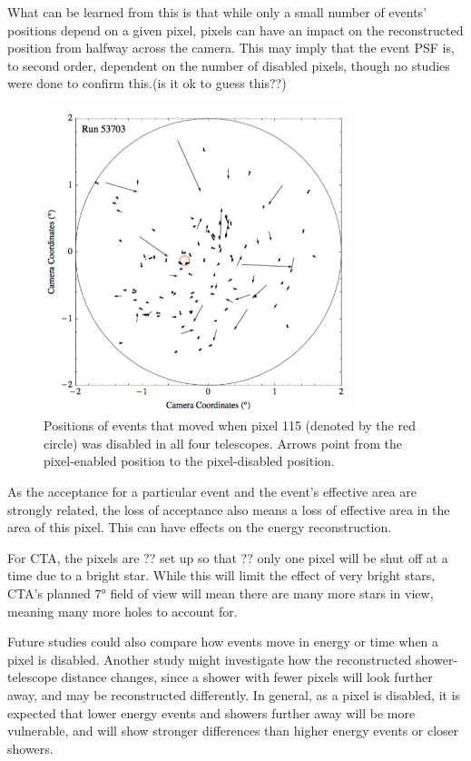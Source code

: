     What can be learned from this is that while only a small number of events' positions depend on a given pixel, pixels can have an impact on the reconstructed position from halfway across the camera.
    This may imply that the event PSF is, to second order, dependent on the number of disabled pixels, though no studies were done to confirm this.(is it ok to guess this??)


    \begin{figure}[ht]
      \begin{center}
        \includegraphics[width=0.8\textwidth]{images/disabled_pixel/moving_events}
        \caption[Event Movement]{Positions of events that moved when pixel 115 (denoted by the red circle) was disabled in all four telescopes.  Arrows point from the pixel-enabled position to the pixel-disabled position.}\label{fig:dpix_move}
      \end{center}
    \end{figure}

    As the acceptance for a particular event and the event's effective area are strongly related, the loss of acceptance also means a loss of effective area in the area of this pixel.
    This can have effects on the energy reconstruction.

    For CTA, the pixels are ?? set up so that ?? only one pixel will be shut off at a time due to a bright star.
    While this will limit the effect of very bright stars, CTA's planned $\ang{7}$ field of view will mean there are many more stars in view, meaning many more holes to account for.

    Future studies could also compare how events move in energy or time when a pixel is disabled.
    Another study might investigate how the reconstructed shower-telescope distance changes, since a shower with fewer pixels will look further away, and may be reconstructed differently.
    In general, as a pixel is disabled, it is expected that lower energy events and showers further away will be more vulnerable, and will show stronger differences than higher energy events or closer showers.


